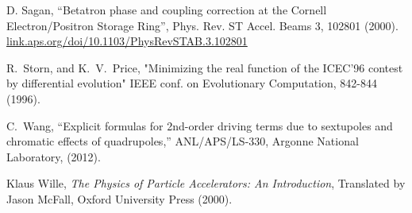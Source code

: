 \begin{thebibliography}{99}
D. Sagan,
``Betatron phase and coupling correction at the Cornell Electron/Positron
Storage Ring'', Phys. Rev. ST Accel. Beams 3, 102801 (2000).
\hfill\break
\hspace*{20pt}
\url{link.aps.org/doi/10.1103/PhysRevSTAB.3.102801}

R.~Storn, and K.~V.~Price, "Minimizing the real function of the
ICEC'96 contest by differential evolution" IEEE conf. on Evolutionary
Computation, 842-844 (1996).

C.~Wang,
``Explicit formulas for 2nd-order driving terms due to sextupoles and
chromatic effects of quadrupoles,''
ANL/APS/LS-330, Argonne National Laboratory, (2012).

Klaus Wille, {\em The Physics of Particle Accelerators: An Introduction},
Translated by Jason McFall, Oxford University Press (2000).

\end{thebibliography}
